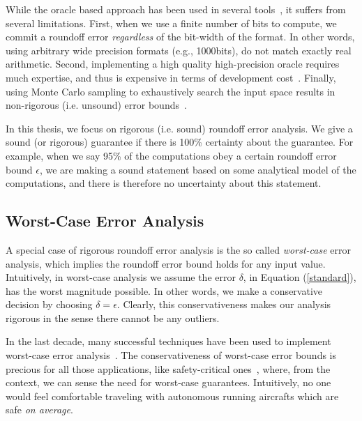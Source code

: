 While the oracle based approach has been used in several tools~\cite{landau2014guide, kahan1996improbability, atomic, blame, herbie}, it suffers from several limitations.
%
First, when we use a finite number of bits to compute, we commit a roundoff error \emph{regardless} of the bit-width of the format.
%
In other words, using arbitrary wide precision formats (e.g., 1000bits), do not match exactly real arithmetic.
%
Second, implementing a high quality high-precision oracle requires much expertise, and thus is expensive in terms of development cost~\cite{atomic}.
%
Finally, using Monte Carlo sampling to exhaustively search the input space results in non-rigorous (i.e. unsound) error bounds~\cite{glasserman2013monte, parker2000monte}.
%

In this thesis, we focus on rigorous (i.e. sound) roundoff error analysis.
%
We give a sound (or rigorous) guarantee if there is 100\% certainty about the guarantee.
%
%
For example, when we say 95\% of the computations obey a certain roundoff error bound $\epsilon$, we are making a sound statement based on some analytical model of the computations, and there is therefore no uncertainty about this statement.
%
%
\subsection{Worst-Case Error Analysis}
\label{sec:worst}
%
A special case of rigorous roundoff error analysis is the so called \emph{worst-case} error analysis, which implies the roundoff error bound holds for any input value.
%
Intuitively, in worst-case analysis we assume the error $\delta$, in Equation (\ref{standard}), has the worst magnitude possible. In other words, we make a conservative decision by choosing $\delta=\epsilon$.
%
Clearly, this conservativeness makes our analysis rigorous in the sense there cannot be any outliers.
%

In the last decade, many successful techniques have been used to implement worst-case error analysis~\cite{darulova2018daisy,2015_fm_sjrg,solovyev2018rigorous,rosa,fptuner,smartfloat,satire,gappa,fluctuat}.
%
%
The conservativeness of worst-case error bounds is precious for all those applications, like safety-critical ones~\cite{guardstable, cpralg}, where, from the context, we can sense the need for worst-case guarantees.
%
Intuitively, no one would feel comfortable traveling with autonomous running aircrafts which are safe \emph{on average}.

